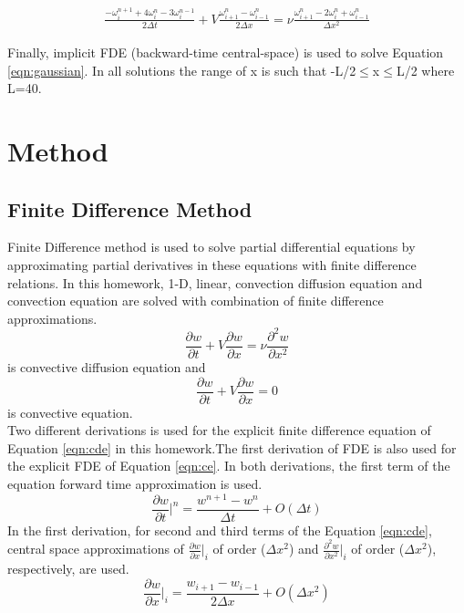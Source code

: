 \documentclass[letterpaper,12pt]{article}
\begin{document}
\begin{eqnarray}
\frac{-\omega^{n+1}_{i}+4\omega^{n}_{i}-3\omega^{n-1}_{i}}{2\Delta t} + V\frac{\omega^{n}_{i+1}-\omega^{n}_{i-1}}{2\Delta x} = \nu\frac{\omega^{n}_{i+1}-2\omega^{n}_{i}+\omega^{n}_{i-1}}{\Delta x^2}
\end{eqnarray}

Finally, implicit FDE (backward-time central-space) is used to solve Equation \ref{eqn:gaussian}.
In all solutions the range of x is such that -L/2$\leq$x$\leq$L/2 where L=40.


\section{Method}
\subsection{Finite Difference Method}
Finite Difference method is used to solve partial differential equations by 
approximating partial derivatives in these equations with finite difference relations.
In this homework, 1-D, linear, convection diffusion equation and convection equation are solved
with combination of finite difference approximations.
\begin{equation}
	\frac{\partial w}{\partial t} + V\frac{\partial w}{\partial x}=\nu\frac{\partial^2 w}{\partial x^2}
	\label{eqn:cde}
\end{equation}
is convective diffusion equation and
\begin{equation}
	\frac{\partial w}{\partial t} + V\frac{\partial w}{\partial x}=0 
	\label{eqn:ce}
\end{equation}
is convective equation.\\
Two different derivations is used for the explicit finite difference equation of 
Equation \ref{eqn:cde} in this homework.The first derivation of FDE is also used for the explicit 
FDE of Equation \ref{eqn:ce}. In both derivations, the first term of
the equation forward time approximation is used.
\begin{equation}
	\frac{\partial w}{\partial t}\vert^{n}=\frac{w^{n+1}-{w^n}}{\Delta t}+O(\Delta t)
	\label{eqn:ft}
\end{equation}
In the first derivation, for second and third terms of the Equation \ref{eqn:cde}, 
central space approximations of
$\frac{\partial w}{\partial x}\vert_{i}$ of order ($\Delta x^2$) and 
$\frac{\partial^2 w}{\partial x^2}\vert_{i}$ of order ($\Delta x^2$), respectively, are used.
\begin{equation}
	\frac{\partial w}{\partial x}\vert_{i}=\frac{w_{i+1}-w_{i-1}}{2\Delta x}+O(\Delta x^2)
	\label{eqn:cs1}
\end{equation}
\end{document}
